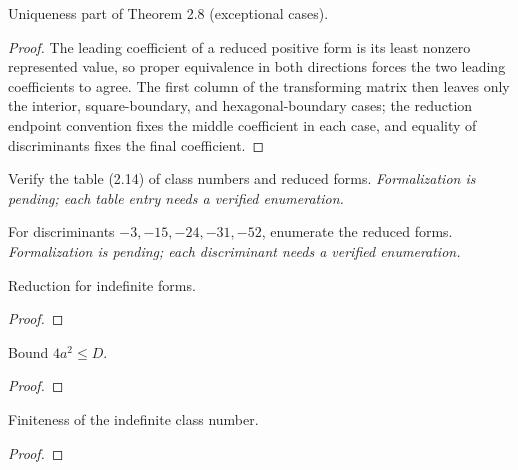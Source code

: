 \begin{theorem}[Exercise 2.8(b)]
  \label{exr:s2_8_b}
  \leanok
  Uniqueness part of Theorem 2.8 (exceptional cases).
\end{theorem}
\begin{proof}\leanok{}
The leading coefficient of a reduced positive form is its least nonzero
represented value, so proper equivalence in both directions forces the two
leading coefficients to agree. The first column of the transforming matrix
then leaves only the interior, square-boundary, and hexagonal-boundary cases;
the reduction endpoint convention fixes the middle coefficient in each case,
and equality of discriminants fixes the final coefficient.
\end{proof}

\begin{theorem}[Exercise 2.9(a)]
  \label{exr:s2_9_a}
  \notready
  Verify the table (2.14) of class numbers and reduced forms. \emph{Formalization
  is pending; each table entry needs a verified enumeration.}
\end{theorem}

\begin{theorem}[Exercise 2.9(b)]
  \label{exr:s2_9_b}
  \notready
  For discriminants $-3,-15,-24,-31,-52$, enumerate the reduced forms.
  \emph{Formalization is pending; each discriminant needs a verified enumeration.}
\end{theorem}

\begin{theorem}[Exercise 2.10(a)]
  \label{exr:s2_10_a}
  \leanok
  Reduction for indefinite forms.
\end{theorem}
\begin{proof}\end{proof}

\begin{theorem}[Exercise 2.10(b)]
  \label{exr:s2_10_b}
  \leanok
  Bound $4a^2 \le D$.
\end{theorem}
\begin{proof}\end{proof}

\begin{theorem}[Exercise 2.10(c)]
  \label{exr:s2_10_c}
  \leanok
  Finiteness of the indefinite class number.
\end{theorem}
\begin{proof}\end{proof}

